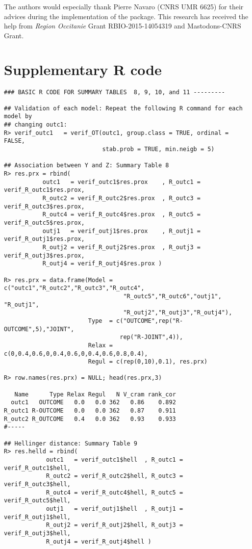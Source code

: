 The authors would especially thank Pierre Navaro (CNRS UMR 6625) for their advices during the implementation of the  package. This research has received the help from \emph{Region Occitanie} Grant RBIO-2015-14054319 and Mastodons-CNRS Grant.

\newpage

\hypertarget{supplementary-r-code}{%
\section{Supplementary R code}\label{supplementary-r-code}}

\begin{verbatim}
### BASIC R CODE FOR SUMMARY TABLES  8, 9, 10, and 11 ---------

## Validation of each model: Repeat the following R command for each model by
## changing outc1:
R> verif_outc1   = verif_OT(outc1, group.class = TRUE, ordinal = FALSE, 
                            stab.prob = TRUE, min.neigb = 5)

## Association between Y and Z: Summary Table 8
R> res.prx = rbind(
           outc1   = verif_outc1$res.prox    , R_outc1 = verif_R_outc1$res.prox, 
           R_outc2 = verif_R_outc2$res.prox  , R_outc3 = verif_R_outc3$res.prox,
           R_outc4 = verif_R_outc4$res.prox  , R_outc5 = verif_R_outc5$res.prox,
           outj1   = verif_outj1$res.prox    , R_outj1 = verif_R_outj1$res.prox,
           R_outj2 = verif_R_outj2$res.prox  , R_outj3 = verif_R_outj3$res.prox,
           R_outj4 = verif_R_outj4$res.prox )
                                
R> res.prx = data.frame(Model = c("outc1","R_outc2","R_outc3","R_outc4",
                                  "R_outc5","R_outc6","outj1", "R_outj1",
                                  "R_outj2","R_outj3","R_outj4"), 
                        Type  = c("OUTCOME",rep("R-OUTCOME",5),"JOINT",
                                 rep("R-JOINT",4)),
                        Relax = c(0,0.4,0.6,0,0.4,0.6,0,0.4,0.6,0.8,0.4), 
                        Regul = c(rep(0,10),0.1), res.prx)

R> row.names(res.prx) = NULL; head(res.prx,3)

   Name      Type Relax Regul   N V_cram rank_cor
  outc1   OUTCOME   0.0   0.0 362   0.86    0.892
R_outc1 R-OUTCOME   0.0   0.0 362   0.87    0.911
R_outc2 R_OUTCOME   0.4   0.0 362   0.93    0.933
#-----

## Hellinger distance: Summary Table 9
R> res.helld = rbind(
            outc1   = verif_outc1$hell  , R_outc1 = verif_R_outc1$hell,
            R_outc2 = verif_R_outc2$hell, R_outc3 = verif_R_outc3$hell, 
            R_outc4 = verif_R_outc4$hell, R_outc5 = verif_R_outc5$hell, 
            outj1   = verif_outj1$hell  , R_outj1 = verif_R_outj1$hell,
            R_outj2 = verif_R_outj2$hell, R_outj3 = verif_R_outj3$hell,
            R_outj4 = verif_R_outj4$hell )


\end{verbatim}
